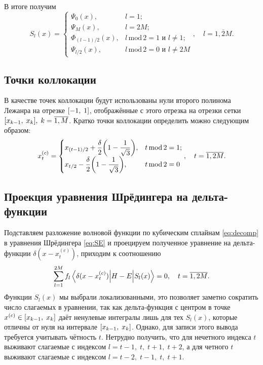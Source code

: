 \documentclass[10pt]{article}
\begin{document}
В итоге получим
\begin{equation}
    S_l(x) =
    \begin{cases}
        \Psi_0(x), &l=1;\\
        \Psi_M(x), &l=2M;\\
         \Phi_{(l-1)/2}(x), &{l\,\textrm{mod}\,2 = 1\textrm{ и }l\ne 1};\\
        \Psi_{l/2}(x), &{l\,\textrm{mod}\,2 = 0\textrm{ и }l\ne 2M}
    \end{cases}
    ,\quad l = \overline{1, 2M}.
\end{equation}

\subsection{Точки коллокации}

В качестве точек коллокации будут использованы нули второго полинома Лежанра на отрезке $\qty[-1,\;1]$, отображённые с этого отрезка на отрезки сетки $\qty[x_{k-1},\;x_{k}],\; k=\overline{1,M}$. Кратко точки коллокации определить можно следующим образом:
\begin{equation}
    x^{(c)}_t =
    \begin{cases}
        x_{(t-1)/2} + \dfrac{\delta}{2} \qty(1 - \dfrac{1}{\sqrt{3}}), &{t\,\textrm{mod}\,2 = 1};\\
        x_{t/2} - \dfrac{\delta}{2} \qty(1 - \dfrac{1}{\sqrt{3}}), &{t\,\textrm{mod}\,2 = 0}
    \end{cases}
    ,\quad t = \overline{1, 2M}.
\end{equation}

\subsection{Проекция уравнения Шрёдингера на дельта-функции}

Подставляем разложение волновой функции по кубическим сплайнам \eqref{eq:decomp} в уравнения Шрёдингера \eqref{eq:SE} и проецируем полученное уравнение на дельта-функции $\delta(x-x^{(c)}_t)$, приходим к соотношению
\begin{equation}
    \sum\limits_{l=1}^{2M} f_{l}
    \mel**{\delta(x-x^{(c)}_t)}{H-E}{S_{l}(x)}=0,\quad t=\overline{1,2M}.
\end{equation}
Функции $S_l(x)$ мы выбрали локализованными, это позволяет заметно сократить число слагаемых в уравнении, так как дельта-функция с центром в точке $x^{(c)}\in\qty[x_{k-1},\;x_{k}]$ даёт ненулевые интегралы лишь для тех $S_l(x)$, которые отличны от нуля на интервале $\qty[x_{k-1},\;x_{k}]$. Однако, для записи этого вывода требуется учитывать чётность $t$. Нетрудно получить, что для нечетного индекса $t$ выживают слагаемые с индексом $l=t-1,\;t,\;t+1,\;t+2$, а для четного $t$ выживают слагаемые с индексом $l=t-2,\;t-1,\;t,\;t+1$.
\end{document}
